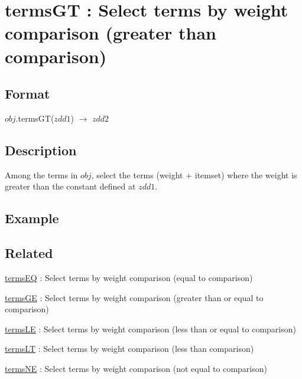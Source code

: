 
\section{termsGT : Select terms by weight comparison (greater than comparison)\label{sect:termsGT}}
\subsection*{Format}
$obj$.termsGT($zdd1$) $\rightarrow$ $zdd2$

\subsection*{Description}
Among the terms in $obj$, select the terms (weight + itemset) where the weight is greater than the constant defined at $zdd1$.

\subsection*{Example}


\subsection*{Related}
\hyperref[sect:termsEQ]{termsEQ} : Select terms by weight comparison (equal to comparison)

\hyperref[sect:termsGE]{termsGE} : Select terms by weight comparison (greater than or equal to comparison)

\hyperref[sect:termsLE]{termsLE} : Select terms by weight comparison (less than or equal to comparison)

\hyperref[sect:termsLT]{termsLT} : Select terms by weight comparison (less than comparison)

\hyperref[sect:termsNE]{termsNE} : Select terms by weight comparison (not equal to comparison)


